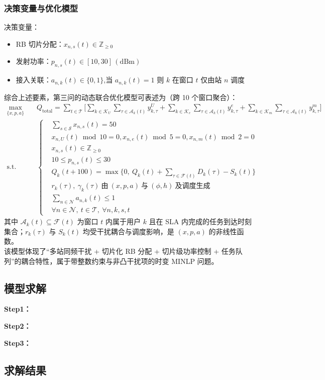 \subsubsection{决策变量与优化模型}

决策变量：
\begin{itemize}
  \item RB 切片分配：$x_{n,s}(t)\in\mathbb{Z}_{\ge 0}$
  \item 发射功率：$p_{n,s}(t)\in[10,30]\,\mathrm{(dBm)}$
  \item 接入关联：$a_{n,k}(t)\in\{0,1\}$,当 $a_{n,k}(t)=1$ 则 $k$ 在窗口 $t$ 仅由站 $n$ 调度
\end{itemize}

综合上述要素，第三问的动态联合优化模型可表述为（跨 10 个窗口聚合）：
\begin{equation}
\begin{aligned}
\max_{\{x,p,a\}}\quad & Q_{\text{total}}=\sum_{t\in\mathcal{T}}\Bigg[\sum_{k\in\mathcal{K}_U}\sum_{\tau\in\mathcal{A}_k(t)} y^{U}_{k,\tau}+\sum_{k\in\mathcal{K}_e}\sum_{\tau\in\mathcal{A}_k(t)} y^{e}_{k,\tau}+\sum_{k\in\mathcal{K}_m}\sum_{\tau\in\mathcal{A}_k(t)} y^{m}_{k,\tau}\Bigg] \\
\text{s.t.}\quad & 
\left\{
\begin{aligned}
&\sum_{s\in\mathcal{S}} x_{n,s}(t)=50 \\
&x_{n,U}(t)\bmod 10=0 ,x_{n,e}(t)\bmod 5=0 ,x_{n,m}(t)\bmod 2=0 \\
&x_{n,s}(t)\in\mathbb{Z}_{\ge 0} \\
&10\le p_{n,s}(t)\le 30\\
&Q_k(t+100)=\max\Big\{0,\ Q_k(t)+\sum_{\tau\in\mathcal{F}(t)} D_k(\tau)-S_k(t)\Big\} \\
&r_k(\tau),\ \gamma_k(\tau)\ \text{由}\ (x,p,a)\ \text{与}\ (\phi,h)\ \text{及调度生成} \\
&\sum_{n\in\mathcal{N}} a_{n,k}(t)\le 1 \\
&\forall n\in\mathcal{N},\ t\in\mathcal{T},\ \forall n,k,s,t
\end{aligned}
\right.
\end{aligned}
\end{equation}
其中 $\mathcal{A}_k(t)\subseteq\mathcal{F}(t)$ 为窗口 $t$ 内属于用户 $k$ 且在 SLA 内完成的任务到达时刻集合；$r_k(\tau)$ 与 $S_k(t)$ 均受干扰耦合与调度影响，是 $(x,p,a)$ 的非线性函数。\\
该模型体现了“多站同频干扰 + 切片化 RB 分配 + 切片级功率控制 + 任务队列”的耦合特性，属于带整数约束与非凸干扰项的时变 MINLP 问题。

\subsection{模型求解}

\textbf{Step1：} 

\textbf{Step2：} 

\textbf{Step3：} 

\subsection{求解结果}